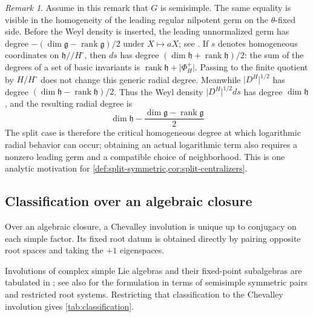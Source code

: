 \documentclass[11pt]{amsart}
\theoremstyle{definition}
\theoremstyle{remark}
\newtheorem{remark}[remark]{Remark}
\newcommand{\rank}{\operatorname{rank}}
\newcommand{\abs}[1]{\lvert #1\rvert}
\newcommand{\g}{\mathfrak g}
\newcommand{\h}{\mathfrak h}
\begin{document}
\begin{remark}\label{rem:homogeneity-divergence}
Assume in this remark that $G$ is semisimple.  The same equality is visible in the homogeneity of the leading regular
nilpotent germ on the $\theta$-fixed side.  Before the Weyl density is
inserted, the leading unnormalized germ has degree
$-(\dim\g-\rank\g)/2$ under $X\mapsto aX$; see
\cite[\S17.7]{KottwitzClay}.  If $s$ denotes homogeneous coordinates on
$\h/\!/H^\circ$, then $ds$ has degree $(\dim\h+\rank\h)/2$: the sum of the
degrees of a set of basic invariants is $\rank\h+\abs{\Phi_H^+}$.  Passing to
the finite quotient by $H/H^\circ$ does not change this generic radial degree.  Meanwhile
$\abs{D^H}^{1/2}$ has degree $(\dim\h-\rank\h)/2$.  Thus the Weyl density
$\abs{D^H}^{1/2}ds$ has degree $\dim\h$, and the resulting radial degree is
\[
 \dim\h-\frac{\dim\g-\rank\g}{2}
\]
The split case is therefore the critical homogeneous degree at which
logarithmic radial behavior can occur; obtaining an actual logarithmic term
also requires a nonzero leading germ and a compatible choice of neighborhood.
This is one analytic motivation
for \cref{def:split-symmetric,cor:split-centralizers}.
\end{remark}

\subsection{Classification over an algebraic closure}
Over an algebraic closure, a Chevalley involution is unique up to conjugacy
on each simple factor.  Its fixed root datum is obtained directly by pairing
opposite root spaces and taking the $+1$ eigenspaces.  

Involutions of complex simple Lie algebras and their fixed-point
subalgebras are tabulated in \cite[Table~7]{OnishchikVinberg}; see also
\cite{HelminckClassification} for the formulation in terms of semisimple
symmetric pairs and restricted root systems.  Restricting that classification
to the Chevalley involution gives \cref{tab:classification}.
\end{document}
